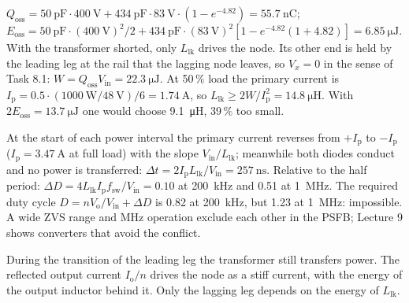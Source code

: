 \begin{solutionblock}
	$Q_\mathrm{oss}=\SI{50}{\pico\farad}\cdot\SI{400}{\volt}+\SI{434}{\pico\farad}\cdot\SI{83}{\volt}\cdot(1-e^{-4.82})=\SI{55.7}{\nano\coulomb}$; $E_\mathrm{oss}=\SI{50}{\pico\farad}\cdot(\SI{400}{\volt})^2/2+\SI{434}{\pico\farad}\cdot(\SI{83}{\volt})^2\left[1-e^{-4.82}(1+4.82)\right]=\SI{6.85}{\micro\joule}$.
	With the transformer shorted, only $L_\mathrm{lk}$ drives the node. Its other end is held by the leading leg at the rail that the lagging node leaves, so $V_x=0$ in the sense of Task 8.1: $W=Q_\mathrm{oss}V_\mathrm{in}=\SI{22.3}{\micro\joule}$. At 50\,\% load the primary current is $I_\mathrm{p}=0.5\cdot(\SI{1000}{\watt}/\SI{48}{\volt})/6=\SI{1.74}{\ampere}$, so $L_\mathrm{lk}\geq2W/I_\mathrm{p}^2=\SI{14.8}{\micro\henry}$. With $2E_\mathrm{oss}=\SI{13.7}{\micro\joule}$ one would choose \SI{9.1}{\micro\henry}, 39\,\% too small.
\end{solutionblock}


\begin{solutionblock}
	At the start of each power interval the primary current reverses from $+I_\mathrm{p}$ to $-I_\mathrm{p}$ ($I_\mathrm{p}=\SI{3.47}{\ampere}$ at full load) with the slope $V_\mathrm{in}/L_\mathrm{lk}$; meanwhile both diodes conduct and no power is transferred: $\Delta t=2I_\mathrm{p}L_\mathrm{lk}/V_\mathrm{in}=\SI{257}{\nano\second}$.
	Relative to the half period: $\Delta D=4L_\mathrm{lk}I_\mathrm{p}f_\mathrm{sw}/V_\mathrm{in}=0.10$ at \SI{200}{\kilo\hertz} and 0.51 at \SI{1}{\mega\hertz}. The required duty cycle $D=nV_\mathrm{o}/V_\mathrm{in}+\Delta D$ is 0.82 at \SI{200}{\kilo\hertz}, but 1.23 at \SI{1}{\mega\hertz}: impossible. A wide ZVS range and MHz operation exclude each other in the PSFB; Lecture 9 shows converters that avoid the conflict.
\end{solutionblock}


\begin{solutionblock}
	During the transition of the leading leg the transformer still transfers power. The reflected output current $I_\mathrm{o}/n$ drives the node as a stiff current, with the energy of the output inductor behind it. Only the lagging leg depends on the energy of $L_\mathrm{lk}$.
\end{solutionblock}

